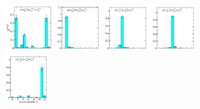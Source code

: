 \begin{figure}
  \includegraphics[width=0.24\textwidth]{figures/spectrum_a1gm/with_tq/zfactors/zfactor_isotriplet_eta_pion-A1gm_1-P000-A1up-SS_0-P000-A1um-SS_0.pdf}
  \includegraphics[width=0.22\textwidth]{figures/spectrum_a1gm/with_tq/zfactors/zfactor_isotriplet_kaon_kbar-A1gm_1-P000-A1u-SS_0-P000-A1u-SS_0.pdf}
  \includegraphics[width=0.22\textwidth]{figures/spectrum_a1gm/with_tq/zfactors/zfactor_isotriplet_phi_pion-A1gm_1-P001-A2p-SS_1-P00-1-A2m-SS_1.pdf}
  \includegraphics[width=0.22\textwidth]{figures/spectrum_a1gm/with_tq/zfactors/zfactor_isotriplet_kaon_kbar-A1gm_1-P001-A2-SS_1-P00-1-A2-SS_1.pdf}\\
  \includegraphics[width=0.22\textwidth]{figures/spectrum_a1gm/with_tq/zfactors/zfactor_isotriplet_eta_pion-A1gm_1-P001-A2p-SS_0-P00-1-A2m-SS_0.pdf}

\end{figure}

